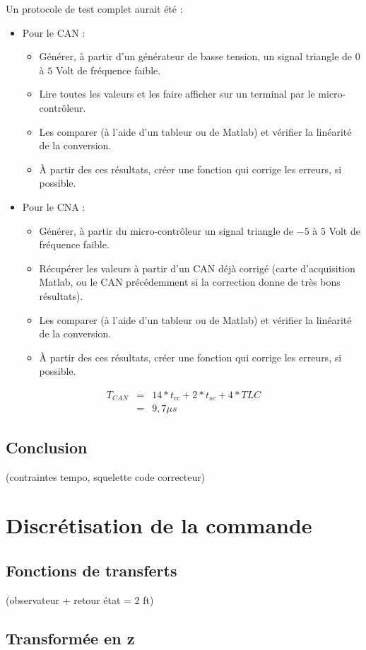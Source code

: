 Un protocole de test complet aurait été :\\
\begin{itemize}
\item Pour le CAN : 
	\begin{itemize}
		\item Générer, à partir d'un générateur de basse tension, un signal triangle de $0$ à $5$ Volt de fréquence faible.
		\item Lire toutes les valeurs et les faire afficher sur un terminal par le micro-contrôleur.
		\item Les comparer (à l'aide d'un tableur ou de Matlab) et vérifier la linéarité de la conversion.
		\item À partir des ces résultats, créer une fonction qui corrige les erreurs, si possible.
	\end{itemize}

\item Pour le CNA :
	\begin{itemize}
		\item Générer, à partir du micro-contrôleur un signal triangle de $-5$ à $5$ Volt de fréquence faible.
		\item Récupérer les valeurs à partir d'un CAN déjà corrigé (carte d'acquisition Matlab, ou le CAN précédemment si la correction donne de très bons résultats).
		\item Les comparer (à l'aide d'un tableur ou de Matlab) et vérifier la linéarité de la conversion.
		\item À partir des ces résultats, créer une fonction qui corrige les erreurs, si possible.
	\end{itemize}
\end{itemize}
\begin{eqnarray}
T_{CAN} &=& 14*t_{cc} + 2*t_{sc} + 4*TLC \\
&=&  9,7 \mu s%
\end{eqnarray}
	\subsection{Conclusion}
	  	(contraintes tempo, squelette code correcteur)
	  	
	  	
	  	

\section{Discrétisation de la commande}
	\subsection{Fonctions de transferts}
		 (observateur + retour état = 2 ft)
	\subsection{Transformée en z}
